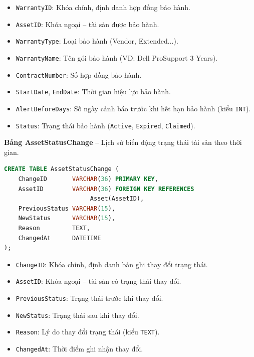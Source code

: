 \begin{itemize}[leftmargin=2em]
    \item \texttt{WarrantyID}: Khóa chính, định danh hợp đồng bảo hành.
    \item \texttt{AssetID}: Khóa ngoại -- tài sản được bảo hành.
    \item \texttt{WarrantyType}: Loại bảo hành (Vendor, Extended...).
    \item \texttt{WarrantyName}: Tên gói bảo hành (VD: Dell ProSupport 3 Years).
    \item \texttt{ContractNumber}: Số hợp đồng bảo hành.
    \item \texttt{StartDate}, \texttt{EndDate}: Thời gian hiệu lực bảo hành.
    \item \texttt{AlertBeforeDays}: Số ngày cảnh báo trước khi hết hạn bảo hành (kiểu \texttt{INT}).
    \item \texttt{Status}: Trạng thái bảo hành (\texttt{Active}, \texttt{Expired}, \texttt{Claimed}).
\end{itemize}

\vspace{0.5em}
\noindent\textbf{Bảng AssetStatusChange} -- Lịch sử biến động trạng thái tài sản theo thời gian.

\begin{tcolorbox}[colback=gray!5, colframe=gray!60, title={\textbf{CREATE TABLE AssetStatusChange}}, fonttitle=\bfseries\small, boxrule=0.5pt, arc=2pt]
\begin{lstlisting}[language=SQL, basicstyle=\ttfamily\small, breaklines=true, showstringspaces=false, keywordstyle=\bfseries\color{blue!70!black}, stringstyle=\color{red!70!black}, commentstyle=\itshape\color{green!50!black}]
CREATE TABLE AssetStatusChange (
    ChangeID       VARCHAR(36) PRIMARY KEY,
    AssetID        VARCHAR(36) FOREIGN KEY REFERENCES
                        Asset(AssetID),
    PreviousStatus VARCHAR(15),
    NewStatus      VARCHAR(15),
    Reason         TEXT,
    ChangedAt      DATETIME
);
\end{lstlisting}
\end{tcolorbox}

\begin{itemize}[leftmargin=2em]
    \item \texttt{ChangeID}: Khóa chính, định danh bản ghi thay đổi trạng thái.
    \item \texttt{AssetID}: Khóa ngoại -- tài sản có trạng thái thay đổi.
    \item \texttt{PreviousStatus}: Trạng thái trước khi thay đổi.
    \item \texttt{NewStatus}: Trạng thái sau khi thay đổi.
    \item \texttt{Reason}: Lý do thay đổi trạng thái (kiểu \texttt{TEXT}).
    \item \texttt{ChangedAt}: Thời điểm ghi nhận thay đổi.
\end{itemize}

